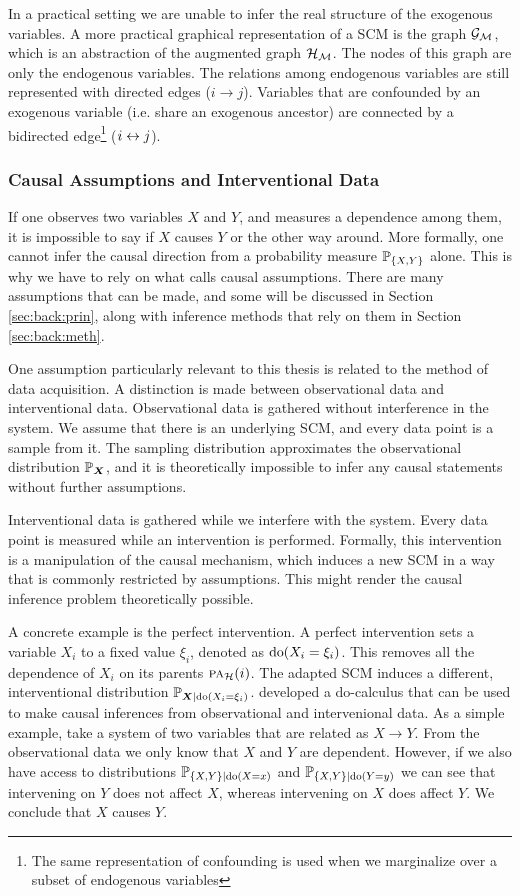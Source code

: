 In a practical setting we are unable to infer the real structure of the exogenous variables. A more practical graphical representation of a SCM is the graph $\mathcal{G}_{\mathcal{M}}$, which is an abstraction of the augmented graph $\mathcal{H}_{\mathcal{M}}$. The nodes of this graph are only the endogenous variables. The relations among endogenous variables are still represented with directed edges ($i \to j$). Variables that are confounded by an exogenous variable (i.e. share an exogenous ancestor) are connected by a bidirected edge\footnote{The same representation of confounding is used when we marginalize over a subset of endogenous variables} ($i\leftrightarrow j$).

\subsubsection{Causal Assumptions and Interventional Data}
If one observes two variables $X$ and $Y$, and measures a dependence among them, it is impossible to say if $X$ causes $Y$ or the other way around. More formally, one cannot infer the causal direction from a probability measure $\mathbb{P}_{\{X,Y\}}$ alone. This is why we have to rely on what \citet{pearl2009causality} calls causal assumptions. There are many assumptions that can be made, and some will be discussed in Section \ref{sec:back:prin}, along with inference methods that rely on them in Section \ref{sec:back:meth}. 

One assumption particularly relevant to this thesis is related to the method of data acquisition. A distinction is made between observational data and interventional data. Observational data is gathered without interference in the system. We assume that there is an underlying SCM, and every data point is a sample from it. The sampling distribution approximates the observational distribution $\mathbb{P}_{\bm{X}}$, and it is theoretically impossible to infer any causal statements without further assumptions. 

Interventional data is gathered while we interfere with the system. Every data point is measured while an intervention is performed. Formally, this intervention is a manipulation of the causal mechanism, which induces a new SCM in a way that is commonly restricted by assumptions. This might render the causal inference problem theoretically possible. 

A concrete example is the perfect intervention. A perfect intervention sets a variable $X_i$ to a fixed value $\xi_i$, denoted as $\mathrm{do}(X_i=\xi_i)$. This removes all the dependence of $X_i$ on its parents $\text{\normalfont\scshape pa}_{\mathcal{H}}(i)$. The adapted SCM induces a different, interventional distribution $\mathbb{P}_{\bm{X}|\mathrm{do}(X_i=\xi_i)}$. \citet{pearl2009causality} developed a do-calculus that can be used to make causal inferences from observational and intervenional data. As a simple example, take a system of two variables that are related as $X\to Y$. From the observational data we only know that $X$ and $Y$ are dependent. However, if we also have access to distributions $\mathbb{P}_{\{X,Y\}|\mathrm{do}(X=x)}$ and $\mathbb{P}_{\{X,Y\}|\mathrm{do}(Y=y)}$ we can see that intervening on $Y$ does not affect $X$, whereas intervening on $X$ does affect $Y$. We conclude that $X$ causes $Y$. 


